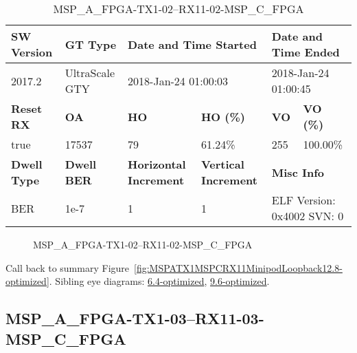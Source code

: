 \begin{table}[h]
\centering
\caption{MSP\_A\_FPGA-TX1-02--RX11-02-MSP\_C\_FPGA}
\label{tab:MSPAFPGATX102RX1102MSPCFPGA12.8-optimized}
\begin{tabular}{@{}|l|l|l|l|l|l|@{}}
\toprule
\textbf{SW Version}                & \textbf{GT Type}   & \multicolumn{2}{l|}{\textbf{Date and Time Started}}            & \multicolumn{2}{l|}{\textbf{Date and Time Ended}}        \\ \midrule
2017.2                       & UltraScale GTY          & \multicolumn{2}{l|}{2018-Jan-24 01:00:03}                   & \multicolumn{2}{l|}{2018-Jan-24 01:00:45}               \\ \midrule
\textbf{Reset RX}                  & \textbf{OA} & \textbf{HO}   & \textbf{HO (\%)} & \textbf{VO} & \textbf{VO (\%)} \\ \midrule
true & 17537        & 79          & 61.24\%        & 255        & 100.00\%       \\ \midrule
\textbf{Dwell Type}                & \textbf{Dwell BER} & \textbf{Horizontal Increment} & \textbf{Vertical Increment}    & \multicolumn{2}{l|}{\textbf{Misc Info}}                  \\ \midrule
BER                            & 1e-7        & 1        & 1           & \multicolumn{2}{l|}{ELF Version: 0x4002 SVN: 0}                         \\ \bottomrule
\end{tabular}
\end{table}

\begin{figure}[h]
\caption{MSP\_A\_FPGA-TX1-02--RX11-02-MSP\_C\_FPGA} \label{fig:MSPAFPGATX102RX1102MSPCFPGA12.8-optimized}
\end{figure}

Call back to summary Figure~\ref{fig:MSPATX1MSPCRX11MinipodLoopback12.8-optimized}.
Sibling eye diagrams: \hyperref[sec:MSPAFPGATX102RX1102MSPCFPGA6.4-optimized]{6.4-optimized}, \hyperref[sec:MSPAFPGATX102RX1102MSPCFPGA9.6-optimized]{9.6-optimized}.

\clearpage
\newpage


\subsection{MSP\_A\_FPGA-TX1-03--RX11-03-MSP\_C\_FPGA}\label{sec:MSPAFPGATX103RX1103MSPCFPGA12.8-optimized}

